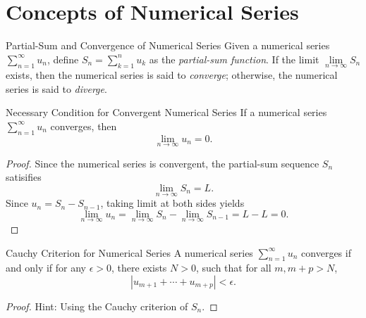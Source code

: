 
\section{Concepts of Numerical Series}

\begin{definition}{Partial-Sum and Convergence of Numerical Series}{}
  Given a numerical series $\sum\limits_{n = 1}^{\infty}u_n$,
  define $S_n = \sum\limits_{k = 1}^n u_k$ as the \emph{partial-sum function}.
  If the limit $\lim \limits _{n \rightarrow \infty} S_n$ exists,
  then the numerical series is said to \emph{converge};
  otherwise, the numerical series is said to \emph{diverge}.
\end{definition}

\begin{proposition}{Necessary Condition for Convergent Numerical Series}{}
  If a numerical series $\sum\limits_{n = 1}^{\infty}u_n$ converges,
  then
  \begin{equation}
    \lim \limits _{n \rightarrow \infty} u_n = 0.
  \end{equation}
\end{proposition}

\begin{proof}
  Since the numerical series is convergent, the partial-sum sequence $S_n$ satisifies
  \begin{equation}
    \lim \limits _{n \rightarrow \infty} S_n = L.
  \end{equation}
  Since $u_n = S_n - S_{n-1}$, taking limit at both sides yields
  \begin{equation}
    \lim \limits _{n \rightarrow \infty} u_n = \lim \limits _{n \rightarrow \infty} S_n - \lim \limits _{n \rightarrow \infty} S_{n-1}
    = L - L = 0.
  \end{equation}
\end{proof}

\begin{proposition}{Cauchy Criterion for Numerical Series}{}
  A numerical series $\sum\limits_{n = 1}^{\infty} u_n$ converges if and only if
  for any $\epsilon > 0$, there exists $N > 0$, such that for all $m, m+p > N$,
  \begin{equation}
    |u_{m+1} + \cdots + u_{m+p}| < \epsilon.
  \end{equation}
\end{proposition}

\begin{proof}
  Hint: Using the Cauchy criterion of $S_n$.
\end{proof}


